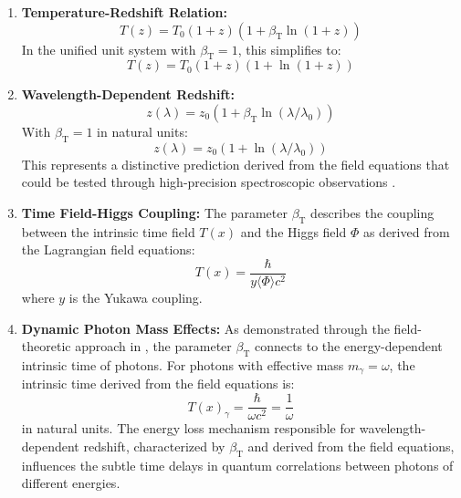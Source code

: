 \documentclass[12pt,a4paper]{article}
\newcommand{\Tfield}{T(x)}
\newcommand{\betaT}{\beta_{\text{T}}}
\begin{document}
	\begin{enumerate}
		\item \textbf{Temperature-Redshift Relation:} 
		\begin{equation}
			\label{eq:temp_redshift}
			T(z) = T_0 (1 + z) (1 + \betaT \ln(1 + z))
		\end{equation}
		In the unified unit system with \(\betaT = 1\), this simplifies to:
		\begin{equation}
			T(z) = T_0 (1 + z) (1 + \ln(1 + z))
		\end{equation}
		
		\item \textbf{Wavelength-Dependent Redshift:} 
		\begin{equation}
			z(\lambda) = z_0 (1 + \betaT \ln(\lambda/\lambda_0))
		\end{equation}
		With \(\betaT = 1\) in natural units:
		\begin{equation}
			z(\lambda) = z_0 (1 + \ln(\lambda/\lambda_0))
		\end{equation}
		This represents a distinctive prediction derived from the field equations that could be tested through high-precision spectroscopic observations \cite{pascher_photons_2025}.
		
		\item \textbf{Time Field-Higgs Coupling:} The parameter \(\betaT\) describes the coupling between the intrinsic time field \(\Tfield\) and the Higgs field \(\Phi\) as derived from the Lagrangian field equations:
		\begin{equation}
			\Tfield = \frac{\hbar}{y \langle \Phi \rangle c^2}
		\end{equation}
		where \(y\) is the Yukawa coupling.
		
		\item \textbf{Dynamic Photon Mass Effects:} As demonstrated through the field-theoretic approach in \cite{pascher_photons_2025}, the parameter \(\betaT\) connects to the energy-dependent intrinsic time of photons. For photons with effective mass \(m_\gamma = \omega\), the intrinsic time derived from the field equations is:
		\begin{equation}
			\Tfield_{\gamma} = \frac{\hbar}{\omega c^2} = \frac{1}{\omega}
		\end{equation}
		in natural units. The energy loss mechanism responsible for wavelength-dependent redshift, characterized by \(\betaT\) and derived from the field equations, influences the subtle time delays in quantum correlations between photons of different energies.
	\end{enumerate}
	
\end{document}
